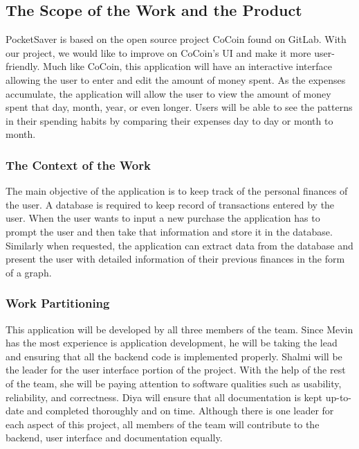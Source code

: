 \documentclass[12pt, titlepage]{article}
\begin{document}
\subsection{The Scope of the Work and the Product}
PocketSaver is based on the open source project CoCoin found on GitLab. With our project, we would like to improve on CoCoin's UI and make it more user-friendly. Much like CoCoin, this application will have an interactive interface allowing the user to enter and edit the amount of money spent. As the expenses accumulate, the application will allow the user to view the amount of money spent that day, month, year, or even longer. Users will be able to see the patterns in their spending habits by comparing their expenses day to day or month to month.

\subsubsection{The Context of the Work}
The main objective of the application is to keep track of the personal finances of the user. A database is required to keep record of transactions entered by the user. When the user wants to input a new purchase the application has to prompt the user and then take that information and store it in the database. Similarly when requested, the application can extract data from the database and present the user with detailed information of their previous finances in the form of a graph.

\subsubsection{Work Partitioning}
This application will be developed by all three members of the team. Since Mevin has the most experience is application development, he will be taking the lead and ensuring that all the backend code is implemented properly. Shalmi will be the leader for the user interface portion of the project. With the help of the rest of the team, she will be paying attention to software qualities such as usability, reliability, and correctness. Diya will ensure that all documentation is kept up-to-date and completed thoroughly and on time. Although there is one leader for each aspect of this project, all members of the team will contribute to the backend, user interface and documentation equally. 
\end{document}
